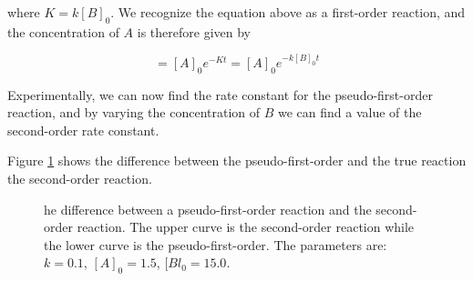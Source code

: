 where $K = k[B]_0$. We recognize the equation above as a first-order reaction, and the concentration of $A$ is therefore given by

\begin{equation}
  [A] = [A]_0 e^{-Kt} = [A]_0 e^{-k[B]_0t}
\end{equation}

Experimentally, we can now find the rate constant for the pseudo-first-order reaction, and by varying the concentration of $B$ we can find a value of the second-order rate constant.

Figure \ref{fig:PseudoFirstOrder} shows the difference between the pseudo-first-order and the true reaction \ie the second-order reaction.

\begin{figure}
  \caption{he difference between a pseudo-first-order reaction and the second-order reaction. The upper curve is the second-order reaction while the lower curve is the pseudo-first-order. The parameters are: $k = 0.1$, $[A]_0 = 1.5$, $[Bl_0 = 15.0$.}
  \label{fig:PseudoFirstOrder}
\end{figure}